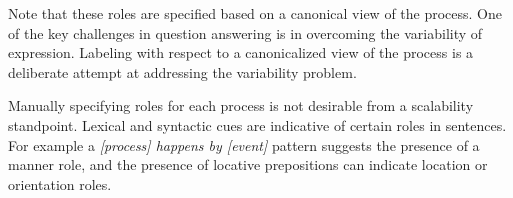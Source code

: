 Note that these roles are specified based on a canonical view of the process. One of the key challenges in question answering is in overcoming the variability of expression. Labeling with respect to a canonicalized view of the process is a deliberate attempt at addressing the variability problem. 

Manually specifying roles for each process is not desirable from a scalability standpoint.
Lexical and syntactic cues are indicative of certain roles in sentences. 
For example a {\em [process] happens by [event]} pattern suggests the presence of a manner role, and the presence of locative prepositions can indicate location or orientation roles. 





%